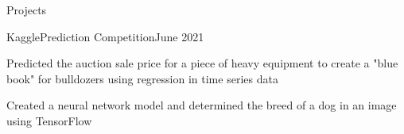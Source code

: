 \documentclass{article}
\newlength{\tabin}
\newlength{\secsep}
\newcommand{\lineunder}{\vspace*{-8pt} \\ \hspace*{-6pt} \hrulefill \\ \vspace*{-15pt}}
\newenvironment{tabbedsection}[1]{
  \begin{list}{}{
      \setlength{\itemsep}{0pt}
      \setlength{\labelsep}{0pt}
      \setlength{\labelwidth}{0pt}
      \setlength{\leftmargin}{\tabin}
      \setlength{\rightmargin}{\tabin}
      \setlength{\listparindent}{0pt}
      \setlength{\parsep}{0pt}
      \setlength{\parskip}{0pt}
      \setlength{\partopsep}{0pt}
      \setlength{\topsep}{#1}
    }
  \item[]
}{\end{list}}
\newenvironment{resume_section}[1]{
  \filbreak
  \vspace{2\secsep}
  \textsc{\large#1}
  \lineunder
  \begin{tabbedsection}{\secsep}
}{\end{tabbedsection}}
\newenvironment{subitems}{
  \renewcommand{\labelitemi}{-}
  \begin{itemize}
      \setlength{\labelsep}{1em}
}{\end{itemize}}
\newenvironment{resume_project}[4]{
  \vspace{\secsep}
  \textbf{#1} \\ 
  \indent {\small #2} \hfill {\footnotesize#3 (#4)}
  \begin{tabbedsection}{0pt}
  \begin{subitems}
}{\end{subitems}\end{tabbedsection}}
\begin{document}
    \begin{resume_section}{Projects}
        \begin{resume_project}{Kaggle}{Prediction Competition}{}{June 2021}
          \item Predicted the auction sale price for a piece of heavy equipment to create a "blue book" for bulldozers using regression in time series data
          \item Created a neural network model and determined the breed of a dog in an image using TensorFlow
        \end{resume_project}
    \end{resume_section}
\end{document}
